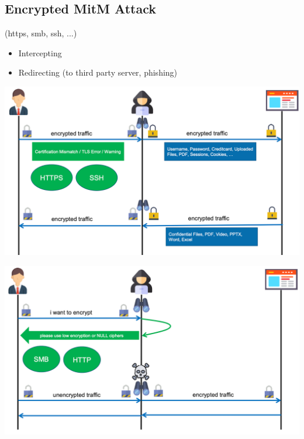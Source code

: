 \subsection{Encrypted MitM Attack}
(https, smb, ssh, ...)
\begin{itemize}
    \item Intercepting
    \item Redirecting (to third party server, phishing)
\end{itemize}
\begin{center}
    \vspace{-8pt}
    \includegraphics[width=1.0\linewidth]{./img/09-mitm/mitm_enctypt_1}
    \vspace{-8pt}
\end{center}
\begin{center}
    \vspace{-8pt}
    \includegraphics[width=1.0\linewidth]{./img/09-mitm/mitm_enctypt_2}
    \vspace{-8pt}
\end{center}
